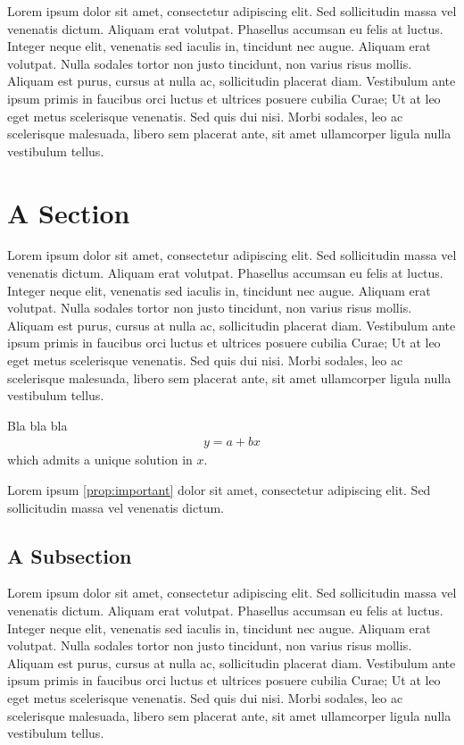Lorem  ipsum dolor sit amet, consectetur adipiscing elit. Sed sollicitudin massa vel venenatis dictum. Aliquam erat volutpat. Phasellus accumsan eu felis at luctus. Integer neque elit, venenatis sed iaculis in, tincidunt nec augue. Aliquam erat volutpat. Nulla sodales tortor non justo tincidunt, non varius risus mollis. Aliquam est purus, cursus at nulla ac, sollicitudin placerat diam. Vestibulum ante ipsum primis in faucibus orci luctus et ultrices posuere cubilia Curae; Ut at leo eget metus scelerisque venenatis. Sed quis dui nisi. Morbi sodales, leo ac scelerisque malesuada, libero sem placerat ante, sit amet ullamcorper ligula nulla vestibulum tellus.


\section{A Section} \label{sec:One}
Lorem ipsum dolor sit amet, consectetur adipiscing elit. Sed sollicitudin massa vel venenatis dictum. Aliquam erat volutpat. Phasellus accumsan eu felis at luctus. Integer neque elit, venenatis sed iaculis in, tincidunt nec augue. Aliquam erat volutpat. Nulla sodales tortor non justo tincidunt, non varius risus mollis. Aliquam est purus, cursus at nulla ac, sollicitudin placerat diam. Vestibulum ante ipsum primis in faucibus orci luctus et ultrices posuere cubilia Curae; Ut at leo eget metus scelerisque venenatis. Sed quis dui nisi. Morbi sodales, leo ac scelerisque malesuada, libero sem placerat ante, sit amet ullamcorper ligula nulla vestibulum tellus.

\begin{proposition}\label{prop:important}
 	Bla bla bla
	\begin{align*}
		y=a + bx
	\end{align*}
 	which admits a unique solution in $x$.
\end{proposition}
\noindent Lorem ipsum \cref{prop:important} dolor sit amet, consectetur adipiscing elit. Sed sollicitudin massa vel venenatis dictum.


\subsection{A Subsection}
Lorem ipsum dolor sit amet, consectetur adipiscing elit. Sed sollicitudin massa vel venenatis dictum. Aliquam erat volutpat. Phasellus accumsan eu felis at luctus. Integer neque elit, venenatis sed iaculis in, tincidunt nec augue. Aliquam erat volutpat. Nulla sodales tortor non justo tincidunt, non varius risus mollis. Aliquam est purus, cursus at nulla ac, sollicitudin placerat diam. Vestibulum ante ipsum primis in faucibus orci luctus et ultrices posuere cubilia Curae; Ut at leo eget metus scelerisque venenatis. Sed quis dui nisi. Morbi sodales, leo ac scelerisque malesuada, libero sem placerat ante, sit amet ullamcorper ligula nulla vestibulum tellus.


